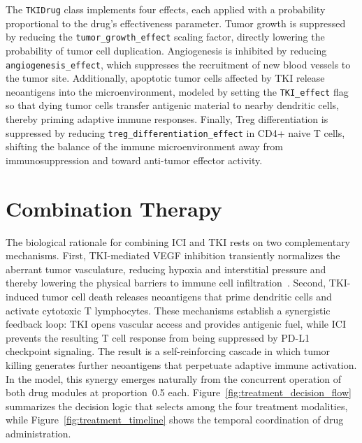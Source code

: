 The \texttt{TKIDrug} class implements four effects, each applied with a probability proportional to the drug's effectiveness parameter. Tumor growth is suppressed by reducing the \texttt{tumor\_growth\_effect} scaling factor, directly lowering the probability of tumor cell duplication. Angiogenesis is inhibited by reducing \texttt{angiogenesis\_effect}, which suppresses the recruitment of new blood vessels to the tumor site. Additionally, apoptotic tumor cells affected by TKI release neoantigens into the microenvironment, modeled by setting the \texttt{TKI\_effect} flag so that dying tumor cells transfer antigenic material to nearby dendritic cells, thereby priming adaptive immune responses. Finally, Treg differentiation is suppressed by reducing \texttt{treg\_differentiation\_effect} in CD4+ naive T cells, shifting the balance of the immune microenvironment away from immunosuppression and toward anti-tumor effector activity.

\section{Combination Therapy}
\label{sec:combination}

The biological rationale for combining ICI and TKI rests on two complementary mechanisms. First, TKI-mediated VEGF inhibition transiently normalizes the aberrant tumor vasculature, reducing hypoxia and interstitial pressure and thereby lowering the physical barriers to immune cell infiltration~\cite{Choueiri2020}. Second, TKI-induced tumor cell death releases neoantigens that prime dendritic cells and activate cytotoxic T lymphocytes. These mechanisms establish a synergistic feedback loop: TKI opens vascular access and provides antigenic fuel, while ICI prevents the resulting T cell response from being suppressed by PD-L1 checkpoint signaling. The result is a self-reinforcing cascade in which tumor killing generates further neoantigens that perpetuate adaptive immune activation. In the model, this synergy emerges naturally from the concurrent operation of both drug modules at proportion~0.5 each. Figure~\ref{fig:treatment_decision_flow} summarizes the decision logic that selects among the four treatment modalities, while Figure~\ref{fig:treatment_timeline} shows the temporal coordination of drug administration.

